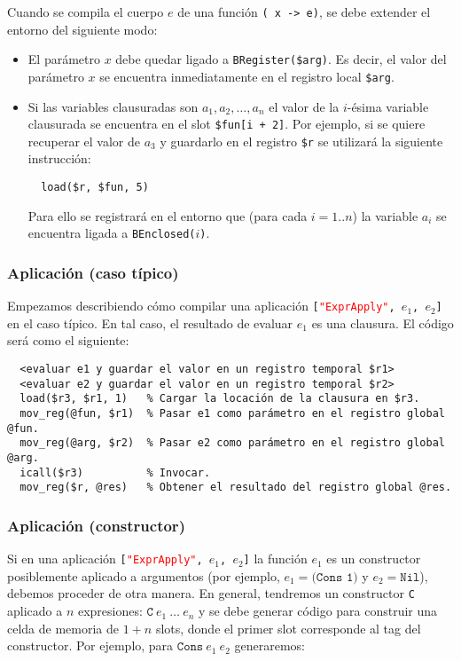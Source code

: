 \documentclass{article}
\newcommand{\fl}[1]{\texttt{#1}}
\newcommand{\astkw}[1]{\texttt{\textcolor{red}{"#1"}}}
\begin{document}
Cuando se compila el cuerpo $e$ de una función \fl{(\ x -> e)},
se debe extender el entorno del siguiente modo:
\begin{itemize}
\item El parámetro $x$ debe quedar ligado a \texttt{BRegister(\$arg)}.
      Es decir, el valor del parámetro $x$ se encuentra inmediatamente
      en el registro local \texttt{\$arg}.
\item Si las variables clausuradas son $a_1,a_2,\hdots,a_n$
      el valor de la $i$-ésima variable clausurada se encuentra
      en el slot \texttt{\$fun[i + 2]}. Por ejemplo, si se quiere
      recuperar el valor de $a_3$ y guardarlo en el registro \texttt{\$r}
      se utilizará la siguiente instrucción:
\begin{verbatim}
  load($r, $fun, 5)
\end{verbatim}
      Para ello se registrará en el entorno que (para cada $i=1..n$)
      la variable $a_i$ se encuentra ligada a \texttt{BEnclosed($i$)}.
\end{itemize}

\subsubsection{Aplicación (caso típico)}

Empezamos describiendo cómo compilar una
aplicación \texttt{[\astkw{ExprApply}, $e_1$, $e_2$]}
en el caso típico.
En tal caso, el resultado de evaluar $e_1$ es una clausura. 
El código será como el siguiente:

\begin{verbatim}
  <evaluar e1 y guardar el valor en un registro temporal $r1>
  <evaluar e2 y guardar el valor en un registro temporal $r2>
  load($r3, $r1, 1)   % Cargar la locación de la clausura en $r3.
  mov_reg(@fun, $r1)  % Pasar e1 como parámetro en el registro global @fun.
  mov_reg(@arg, $r2)  % Pasar e2 como parámetro en el registro global @arg.
  icall($r3)          % Invocar.
  mov_reg($r, @res)   % Obtener el resultado del registro global @res.
\end{verbatim}

\subsubsection{Aplicación (constructor)}

Si en una aplicación \texttt{[\astkw{ExprApply}, $e_1$, $e_2$]}
la función $e_1$ es un constructor posiblemente aplicado a argumentos
(por ejemplo, $e_1 = \texttt{(Cons 1)}$ y $e_2 = \texttt{Nil}$),
debemos proceder de otra manera.
En general,
tendremos un constructor \texttt{C} aplicado a $n$ expresiones:
$\texttt{C}\ e_1\ \hdots\ e_n$ y se debe generar código para
construir una celda de memoria de $1+n$ slots,
donde el primer slot corresponde al tag del constructor. 
Por ejemplo, para $\texttt{Cons}\ e_1\ e_2$
generaremos:
\end{document}
